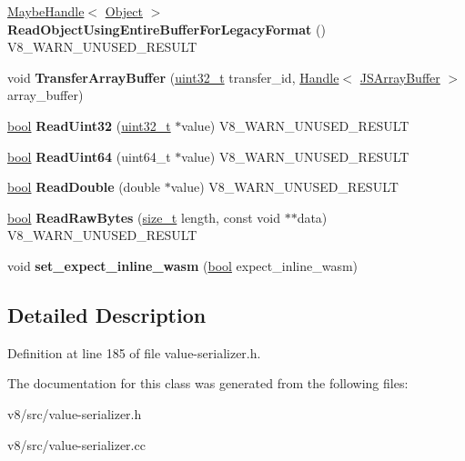 \begin{DoxyCompactItemize}
\mbox{\hyperlink{classv8_1_1internal_1_1MaybeHandle}{Maybe\+Handle}}$<$ \mbox{\hyperlink{classv8_1_1internal_1_1Object}{Object}} $>$ {\bfseries Read\+Object\+Using\+Entire\+Buffer\+For\+Legacy\+Format} () V8\+\_\+\+W\+A\+R\+N\+\_\+\+U\+N\+U\+S\+E\+D\+\_\+\+R\+E\+S\+U\+LT
\item 
\mbox{\label{classv8_1_1internal_1_1ValueDeserializer_acd272faa2a82bc3cf48fd3a0027784f0}} 
void {\bfseries Transfer\+Array\+Buffer} (\mbox{\hyperlink{classuint32__t}{uint32\+\_\+t}} transfer\+\_\+id, \mbox{\hyperlink{classv8_1_1internal_1_1Handle}{Handle}}$<$ \mbox{\hyperlink{classv8_1_1internal_1_1JSArrayBuffer}{J\+S\+Array\+Buffer}} $>$ array\+\_\+buffer)
\item 
\mbox{\label{classv8_1_1internal_1_1ValueDeserializer_ab633fdecf2a3add6de0d16dc334aeea4}} 
\mbox{\hyperlink{classbool}{bool}} {\bfseries Read\+Uint32} (\mbox{\hyperlink{classuint32__t}{uint32\+\_\+t}} $\ast$value) V8\+\_\+\+W\+A\+R\+N\+\_\+\+U\+N\+U\+S\+E\+D\+\_\+\+R\+E\+S\+U\+LT
\item 
\mbox{\label{classv8_1_1internal_1_1ValueDeserializer_a5c36a3c5a0fda0db220e1b4b8db80994}} 
\mbox{\hyperlink{classbool}{bool}} {\bfseries Read\+Uint64} (uint64\+\_\+t $\ast$value) V8\+\_\+\+W\+A\+R\+N\+\_\+\+U\+N\+U\+S\+E\+D\+\_\+\+R\+E\+S\+U\+LT
\item 
\mbox{\label{classv8_1_1internal_1_1ValueDeserializer_a9b24de4a16cf54d63f80e3c7e7d51536}} 
\mbox{\hyperlink{classbool}{bool}} {\bfseries Read\+Double} (double $\ast$value) V8\+\_\+\+W\+A\+R\+N\+\_\+\+U\+N\+U\+S\+E\+D\+\_\+\+R\+E\+S\+U\+LT
\item 
\mbox{\label{classv8_1_1internal_1_1ValueDeserializer_a7b4f665de5f19915d1c96a0cda115343}} 
\mbox{\hyperlink{classbool}{bool}} {\bfseries Read\+Raw\+Bytes} (\mbox{\hyperlink{classsize__t}{size\+\_\+t}} length, const void $\ast$$\ast$data) V8\+\_\+\+W\+A\+R\+N\+\_\+\+U\+N\+U\+S\+E\+D\+\_\+\+R\+E\+S\+U\+LT
\item 
\mbox{\label{classv8_1_1internal_1_1ValueDeserializer_ac49c4a15a11886f79d71558101a155ad}} 
void {\bfseries set\+\_\+expect\+\_\+inline\+\_\+wasm} (\mbox{\hyperlink{classbool}{bool}} expect\+\_\+inline\+\_\+wasm)
\end{DoxyCompactItemize}


\subsection{Detailed Description}


Definition at line 185 of file value-\/serializer.\+h.



The documentation for this class was generated from the following files\+:\begin{DoxyCompactItemize}
\item 
v8/src/value-\/serializer.\+h\item 
v8/src/value-\/serializer.\+cc\end{DoxyCompactItemize}
